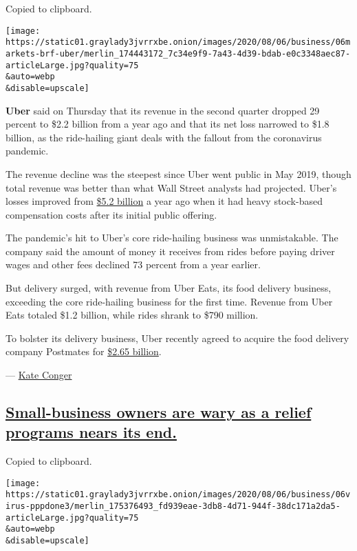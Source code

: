 Copied to clipboard.

\texttt{[image: https://static01.graylady3jvrrxbe.onion/images/2020/08/06/business/06markets-brf-uber/merlin\_174443172\_7c34e9f9-7a43-4d39-bdab-e0c3348aec87-articleLarge.jpg?quality=75\\\&auto=webp\\\&disable=upscale]}

\textbf{Uber} said on Thursday that its revenue in the second quarter
dropped 29 percent to \$2.2 billion from a year ago and that its net
loss narrowed to \$1.8 billion, as the ride-hailing giant deals with the
fallout from the coronavirus pandemic.

The revenue decline was the steepest since Uber went public in May 2019,
though total revenue was better than what Wall Street analysts had
projected. Uber's losses improved from
\href{https://www.nytimes3xbfgragh.onion/2019/08/08/technology/uber-earnings.html}{\$5.2
billion} a year ago when it had heavy stock-based compensation costs
after its initial public offering.

The pandemic's hit to Uber's core ride-hailing business was
unmistakable. The company said the amount of money it receives from
rides before paying driver wages and other fees declined 73 percent from
a year earlier.

But delivery surged, with revenue from Uber Eats, its food delivery
business, exceeding the core ride-hailing business for the first time.
Revenue from Uber Eats totaled \$1.2 billion, while rides shrank to
\$790 million.

To bolster its delivery business, Uber recently agreed to acquire the
food delivery company Postmates for
\href{https://www.nytimes3xbfgragh.onion/2020/07/05/technology/uber-postmates-deal.html}{\$2.65
billion}.

--- \href{https://www.nytimes3xbfgragh.onion/by/kate-conger}{Kate
Conger}

\hypertarget{small-business-owners-are-wary-as-a-relief-programs-nears-its-end}{%
\subsection{\texorpdfstring{\protect\hyperlink{small-business-owners-are-wary-as-a-relief-programs-nears-its-end}{Small-business
owners are wary as a relief programs nears its
end.}}{Small-business owners are wary as a relief programs nears its end.}}\label{small-business-owners-are-wary-as-a-relief-programs-nears-its-end}}

Copied to clipboard.

\texttt{[image: https://static01.graylady3jvrrxbe.onion/images/2020/08/06/business/06virus-pppdone3/merlin\_175376493\_fd939eae-3db8-4d71-944f-38dc171a2da5-articleLarge.jpg?quality=75\\\&auto=webp\\\&disable=upscale]}


